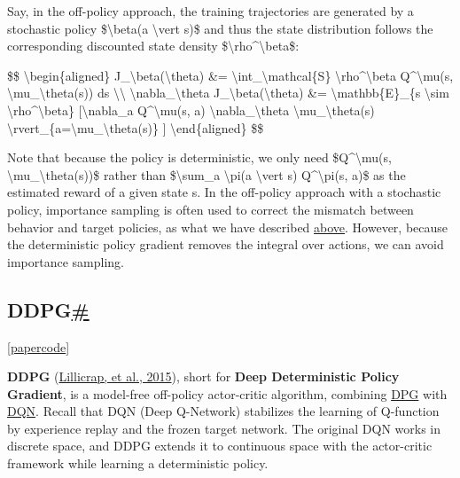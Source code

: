 Say, in the off-policy approach, the training trajectories are generated by a stochastic policy \$\textbackslash beta(a \textbackslash vert s)\$ and thus the state distribution follows the corresponding discounted state density \$\textbackslash rho\^{}\textbackslash beta\$:

\$\$ \textbackslash begin\{aligned\} J\_\textbackslash beta(\textbackslash theta) \&= \textbackslash int\_\textbackslash mathcal\{S\} \textbackslash rho\^{}\textbackslash beta Q\^{}\textbackslash mu(s, \textbackslash mu\_\textbackslash theta(s)) ds \textbackslash\textbackslash{} \textbackslash nabla\_\textbackslash theta J\_\textbackslash beta(\textbackslash theta) \&= \textbackslash mathbb\{E\}\_\{s \textbackslash sim \textbackslash rho\^{}\textbackslash beta\} {[}\textbackslash nabla\_a Q\^{}\textbackslash mu(s, a) \textbackslash nabla\_\textbackslash theta \textbackslash mu\_\textbackslash theta(s) \textbackslash rvert\_\{a=\textbackslash mu\_\textbackslash theta(s)\} {]} \textbackslash end\{aligned\} \$\$

Note that because the policy is deterministic, we only need \$Q\^{}\textbackslash mu(s, \textbackslash mu\_\textbackslash theta(s))\$ rather than \$\textbackslash sum\_a \textbackslash pi(a \textbackslash vert s) Q\^{}\textbackslash pi(s, a)\$ as the estimated reward of a given state s. In the off-policy approach with a stochastic policy, importance sampling is often used to correct the mismatch between behavior and target policies, as what we have described \hyperref[off-policy-policy-gradient]{above}. However, because the deterministic policy gradient removes the integral over actions, we can avoid importance sampling.

\subsection{\texorpdfstring{DDPG\hyperref[ddpg]{\#}}{DDPG\#}}\label{ddpg}

{[}\href{https://arxiv.org/pdf/1509.02971.pdf}{paper}\textbar{}\href{https://github.com/openai/baselines/tree/master/baselines/ddpg}{code}{]}

\textbf{DDPG} (\href{https://arxiv.org/pdf/1509.02971.pdf}{Lillicrap, et al., 2015}), short for \textbf{Deep Deterministic Policy Gradient}, is a model-free off-policy actor-critic algorithm, combining \hyperref[dpg]{DPG} with \href{https://lilianweng.github.io/posts/2018-02-19-rl-overview/\#deep-q-network}{DQN}. Recall that DQN (Deep Q-Network) stabilizes the learning of Q-function by experience replay and the frozen target network. The original DQN works in discrete space, and DDPG extends it to continuous space with the actor-critic framework while learning a deterministic policy.

